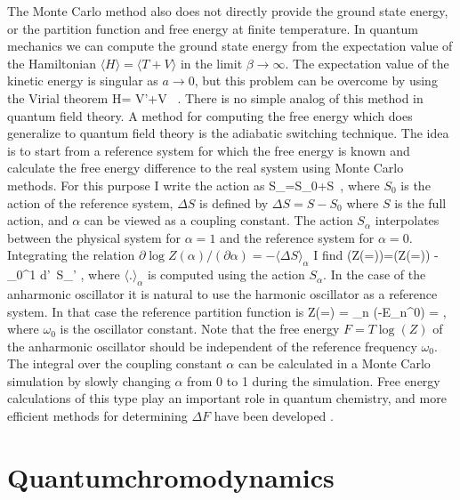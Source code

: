  The Monte Carlo method also does not directly provide the ground state
energy, or the partition function and free energy at finite temperature.
In quantum mechanics we can compute the ground state energy from the 
expectation value of the Hamiltonian $\langle H\rangle = \langle T+V
\rangle$ in the limit $\beta\to\infty$. The expectation value of the kinetic 
energy is singular as $a\to 0$, but this problem can be overcome by using
the Virial theorem
\be 
\langle H\rangle = \left\langle {}V'+V \right\rangle\, . 
\ee
There is no simple analog of this method in quantum field theory. A method 
for computing the free energy which does generalize to quantum field theory
is the adiabatic switching technique. The idea is to start from a reference 
system for which the free energy is known and calculate the free energy 
difference to the real system using Monte Carlo methods. For this purpose 
I write the action as 
\be 
S_\alpha=S_0+\alpha\Delta S\, , 
\ee
where $S_0$ is the action of the reference system, $\Delta S$ is defined 
by $\Delta S=S-S_0$ where $S$ is the full action, and $\alpha$ can be viewed 
as a coupling constant. The action $S_\alpha$ interpolates between the 
physical system for $\alpha=1$ and the reference system for $\alpha=0$. 
Integrating the relation $\partial \log Z(\alpha)/(\partial\alpha)=
-\langle \Delta S \rangle_\alpha$ I find
\be
\label{adiab}
 \log(Z(\alpha\!=))=\log(Z(\alpha\!=)) 
 - \int_0^1 d\alpha'\, \langle \Delta S\rangle_{\alpha'} \;\; ,
\ee
where $\langle .\rangle_\alpha$ is computed using the action $S_\alpha$. In 
the case of the anharmonic oscillator it is natural to use the harmonic 
oscillator as a reference system. In that case the reference partition
function is 
\be 
 Z(\alpha\!=) = \sum_n \exp(-\beta E_n^0) 
  = ,
\ee
where $\omega_0$ is the oscillator constant. Note that the free energy 
$F=T\log(Z)$ of the anharmonic oscillator should be independent of the 
reference frequency $\omega_0$. The integral over the coupling constant 
$\alpha$ can be calculated in a Monte Carlo simulation by slowly changing 
$\alpha$ from 0 to 1 during the simulation. Free energy calculations of 
this type play an important role in quantum chemistry, and more efficient 
methods for determining $\Delta F$ have been developed \cite{Jarzynski:1997}.


\section{Quantumchromodynamics}
